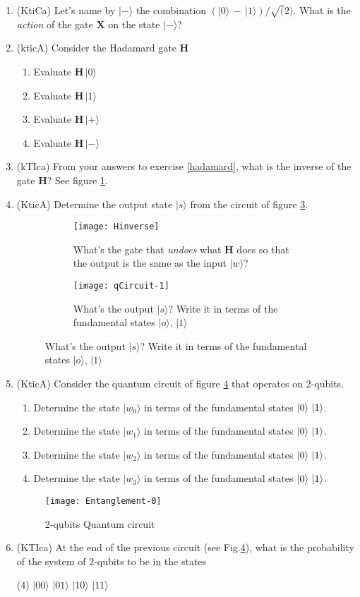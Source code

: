 \documentclass{article}
\begin{document}
\begin{enumerate}
\item (KtiCa) Let's name by $|-\rangle$ the combination $(|0\rangle\,-\,|1\rangle)/\sqrt(2)$. What is the \textit{action} of the gate $\mathbf{X}$ on the state $|-\rangle$?
\item (kticA) \label{hadamard}Consider the Hadamard gate $\mathbf{H}$
	\begin{enumerate}
	\item Evaluate $\mathbf{H}\,|0\rangle$
	\item Evaluate $\mathbf{H}\,|1\rangle$
	\item Evaluate $\mathbf{H}\,|+\rangle$
	\item Evaluate $\mathbf{H}\,|-\rangle$
	\end{enumerate}
\item (kTIca) From your answers to exercise \ref{hadamard}, what is the inverse of the gate $\mathbf{H}$? See figure \ref{Hinverse}.
\item (KticA) Determine the output state $|s\rangle$ from the circuit of figure \ref{qCircuit-1}.
\begin{figure}[h!]
\centering
	\begin{subfigure}[h]{0.7\textwidth}
	\texttt{[image: Hinverse]}
	\caption{What's the gate that \textit{undoes} what $\mathbf{H}$ does so that the output is the same as the input $|w\rangle$?}
	\label{Hinverse}
	\end{subfigure}
	\begin{subfigure}[h]{0.7\textwidth}
	\texttt{[image: qCircuit-1]}
	\caption{What's the output $|s\rangle$? Write it in terms of the fundamental states $|o\rangle,\,|1\rangle$}
	\label{qCircuit-1}
	\end{subfigure}
\end{figure}
\item (KticA) Consider the quantum circuit of figure \ref{Entanglement-0} that operates on 2-qubits.
	\begin{enumerate}
	\item Determine the state $|w_0\rangle$ in terms of the fundamental states $|0\rangle\,\mbox\,|1\rangle$. 
	\item Determine the state $|w_1\rangle$ in terms of the fundamental states $|0\rangle\,\mbox\,|1\rangle$. 
	\item Determine the state $|w_2\rangle$ in terms of the fundamental states $|0\rangle\,\mbox\,|1\rangle$. 
	\item Determine the state $|w_3\rangle$ in terms of the fundamental states $|0\rangle\,\mbox\,|1\rangle$. 
	\end{enumerate}
\begin{figure}[h]
\centering
\texttt{[image: Entanglement-0]}
\caption{2-qubits Quantum circuit}
\label{Entanglement-0}
\end{figure}
\item (KTIca) At the end of the previous circuit (see Fig.\ref{Entanglement-0}), what is the probability of the system of 2-qubits to be in the states
	\begin{tasks}(4) \task $|00\rangle$ \task $|01\rangle$ \task $|10\rangle$ \task $|11\rangle$  \end{tasks}


\end{enumerate}
\end{document}

